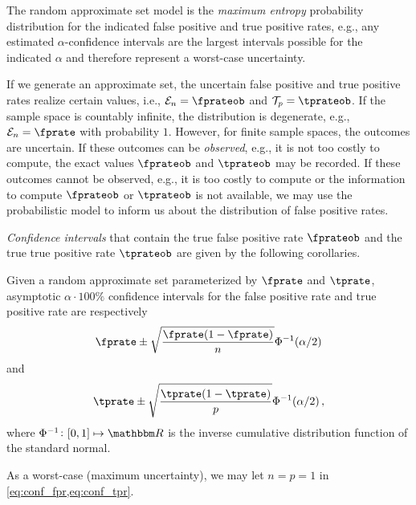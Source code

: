 \documentclass[ ../main.tex]{subfiles}
\begin{document}
The random approximate set model is the \emph{maximum entropy} probability distribution for the indicated false positive and true positive rates, e.g., any estimated $\alpha$-confidence intervals are the largest intervals possible for the indicated $\alpha$ and therefore represent a worst-case uncertainty.

If we generate an approximate set, the uncertain false positive and true positive rates realize certain values, i.e., $\FPR_n = \fprateob$ and $\TPR_p = \tprateob$.
If the sample space is countably infinite, the distribution is degenerate, e.g., $\FPR_n = \fprate$ with probability $1$. 
However, for finite sample spaces, the outcomes are uncertain.
If these outcomes can be \emph{observed}, e.g., it is not too costly to compute, the exact values $\fprateob$ and $\tprateob$ may be recorded.
If these outcomes cannot be observed, e.g., it is too costly to compute or the information to compute $\fprateob$ or $\tprateob$ is not available, we may use the probabilistic model to inform us about the distribution of false positive rates.

\emph{Confidence intervals} that contain the true false positive rate $\fprateob$ and the true true positive rate $\tprateob$ are given by the following corollaries.
\begin{theorem}
    Given a random approximate set parameterized by $\fprate$ and $\tprate$, asymptotic $\alpha \cdot 100\%$ confidence intervals for the false positive rate and true positive rate are respectively
    \begin{equation}
    \label{eq:conf_fpr}
    \fprate \pm \sqrt{\frac{\fprate(1-\fprate)}{n}} \Phi^{-1}(\alpha/2)
    \end{equation}
    and
    \begin{equation}
    \label{eq:conf_tpr}
    \tprate \pm \sqrt{\frac{\tprate(1-\tprate)}{p}} \Phi^{-1}(\alpha/2)\,,
    \end{equation}
    where $\Phi^{-1} \colon [0,1] \mapsto \RealSet$ is the inverse cumulative distribution function of the standard normal.
\end{theorem}
As a worst-case (maximum uncertainty), we may let $n = p = 1$ in \cref{eq:conf_fpr,eq:conf_tpr}.
\end{document}
